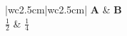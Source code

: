\documentclass{article}
\begin{document}
\begin{tcolorbox}[breakable]
\begin{longtable}{|w{c}{2.5cm}|w{c}{2.5cm}|}
\hline
\textbf{A} & \textbf{B} \\
\hline
\endhead
\endfoot
$\frac12$ & $\frac14$ \\
\hline
\end{longtable}
\end{tcolorbox}
\end{document}
